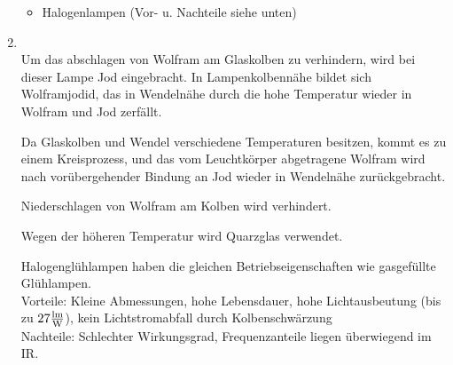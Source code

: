 \begin{enumerate}
\begin{itemize}
                \item Halogenlampen (Vor- u. Nachteile siehe unten)
            \end{itemize}


    \item   {}\\
    
    Um das abschlagen von Wolfram am Glaskolben zu verhindern, wird bei dieser Lampe Jod eingebracht. In Lampenkolbennähe bildet
    sich Wolframjodid, das in Wendelnähe durch die hohe Temperatur wieder in Wolfram und
    Jod zerfällt.
    
    Da Glaskolben und Wendel verschiedene Temperaturen besitzen, kommt es zu einem
    Kreisprozess, und das vom Leuchtkörper abgetragene Wolfram wird nach vorübergehender
    Bindung an Jod wieder in Wendelnähe zurückgebracht.
    
    Niederschlagen von Wolfram am Kolben wird verhindert.
    
    Wegen der höheren Temperatur wird Quarzglas verwendet.
    
    Halogenglühlampen haben die gleichen Betriebseigenschaften wie gasgefüllte Glühlampen.\\ 
    
            Vorteile: Kleine Abmessungen, hohe Lebensdauer, hohe Lichtausbeutung (bis zu $27\frac{\textnormal{lm}}{\textnormal{W}}$), kein Lichtstromabfall durch Kolbenschwärzung\\
            Nachteile: Schlechter Wirkungsgrad, Frequenzanteile liegen überwiegend im IR.
\end{enumerate}